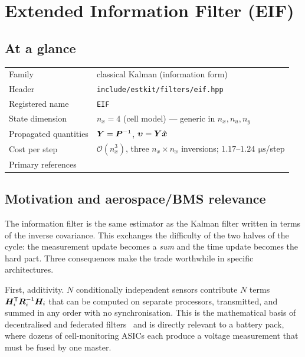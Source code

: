 \chapter{Extended Information Filter (EIF)}
\label{ch:eif}

\section*{At a glance}
\begin{tabular}{@{}l>{\raggedright\arraybackslash}p{}@{}}
Family & classical Kalman (information form) \\
Header & \texttt{include/estkit/filters/eif.hpp} \\
Registered name & \texttt{EIF} \\
State dimension & $n_x = 4$ (cell model) --- generic in $n_x, n_u, n_y$ \\
Propagated quantities & $\bm{Y} = \bm{P}^{-1}$, $\bm{\upsilon} = \bm{Y}\hat{\bm{x}}$ \\
Cost per step & $\mathcal{O}(n_x^3)$, three $n_x\times n_x$ inversions; $1.17$--$1.24\,\SI{}{\micro\second}$/step \\
Primary references & \cite{mutambara1998,andersonmoore1979,maybeck1979,thrun2005} \\
\end{tabular}

\section{Motivation and aerospace/BMS relevance}
The information filter is the same estimator as the Kalman filter written in terms of the
inverse covariance. This exchanges the difficulty of the two halves of the cycle: the
measurement update becomes a \emph{sum} and the time update becomes the hard part. Three
consequences make the trade worthwhile in specific architectures.

First, additivity. $N$ conditionally independent sensors contribute $N$ terms
$\bm{H}_i^{\mathsf{T}}\bm{R}_i^{-1}\bm{H}_i$ that can be computed on separate processors, transmitted, and summed
in any order with no synchronisation. This is the mathematical basis of decentralised and
federated filters~\cite{mutambara1998,carlson1990federated} and is directly relevant to a
battery pack, where dozens of cell-monitoring ASICs each produce a voltage measurement that
must be fused by one master.

